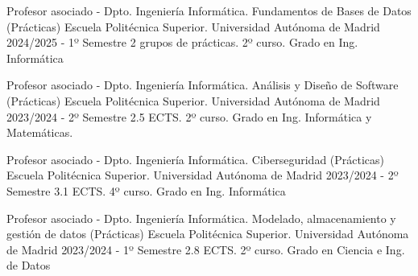 

\begin{cventries}



  \cventry
	{Profesor asociado - Dpto. Ingeniería Informática.} %
	{Fundamentos de Bases de Datos (Prácticas)} %
	{Escuela Politécnica Superior. Universidad Autónoma de Madrid} %
	{2024/2025 - 1º Semestre} %
	{2 grupos de prácticas. 2º curso. Grado en Ing. Informática}
	
  \cventry
    {Profesor asociado - Dpto. Ingeniería Informática.} %
    {Análisis y Diseño de Software (Prácticas)} %
    {Escuela Politécnica Superior. Universidad Autónoma de Madrid} %
    {2023/2024 - 2º Semestre} %
    {2.5 ECTS. 2º curso. Grado en Ing. Informática y Matemáticas.}
    
  \cventry
	{Profesor asociado - Dpto. Ingeniería Informática.} %
	{Ciberseguridad (Prácticas)} %
	{Escuela Politécnica Superior. Universidad Autónoma de Madrid} %
	{2023/2024 - 2º Semestre} %
	{3.1 ECTS. 4º curso. Grado en Ing. Informática}
	
  \cventry
	{Profesor asociado - Dpto. Ingeniería Informática.} %
	{Modelado, almacenamiento y gestión de datos (Prácticas)} %
	{Escuela Politécnica Superior. Universidad Autónoma de Madrid} %
	{2023/2024 - 1º Semestre} %
	{2.8 ECTS. 2º curso. Grado en Ciencia e Ing. de Datos}
	

\end{cventries}
